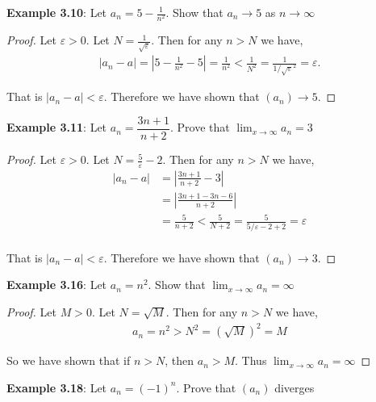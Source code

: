\documentclass{article}
\begin{document}
\textbf{Example 3.10}: Let $a_n = 5 - \frac{1}{n^2}$. Show that $a_n \rightarrow 5$ as $n \rightarrow \infty$

\begin{proof}
	Let $\varepsilon > 0$. Let $N = \tfrac{1}{\sqrt{\varepsilon}}$. Then for any $n > N$ we have,
	\begin{align*}
		|a_n - a| = \left\lvert5 - \frac{1}{n^2} - 5\right\rvert = \frac{1}{n^2} < \frac{1}{N^2} = \frac{1}{1 / \sqrt{\varepsilon}^2} = \varepsilon.
	\end{align*}

	That is $|a_n - a| < \varepsilon$. Therefore we have shown that $(a_n) \rightarrow 5$.
\end{proof}

\textbf{Example 3.11}: Let $a_n = \dfrac{3n + 1}{n +2}$. Prove that $\lim_{x \to \infty} a_n = 3$

\begin{proof}
	Let $\varepsilon > 0$. Let $N = \tfrac{5}{\varepsilon} - 2$. Then for any $n > N$ we have,
	\begin{align*}
		|a_n - a| & = \left\lvert\frac{3n + 1}{n + 2} - 3\right\rvert                                   \\
		          & = \left\lvert\frac{3n + 1 - 3n - 6}{n + 2}\right\rvert                              \\
		          & = \frac{5}{n + 2} < \frac{5}{N + 2} = \frac{5}{5/\varepsilon - 2 + 2} = \varepsilon \\
	\end{align*}

	That is $|a_n - a| < \varepsilon$. Therefore we have shown that $(a_n) \rightarrow 3$.
\end{proof}

\textbf{Example 3.16}: Let $a_n = n^2$. Show that $\lim_{x \to \infty} a_n = \infty$
\begin{proof}
	Let $M > 0$. Let $N = \sqrt{M}$. Then for any $n > N$ we have,
	\begin{align*}
		a_n = n^2 > N^2 = \left(\sqrt{M}\right)^2 = M
	\end{align*}

	So we have shown that if $n > N$, then $a_n > M$. Thus $\lim_{x \to \infty} a_n = \infty$
\end{proof}

\textbf{Example 3.18}: Let $a_n = (-1)^n$. Prove that $(a_n)$ diverges
\end{document}

